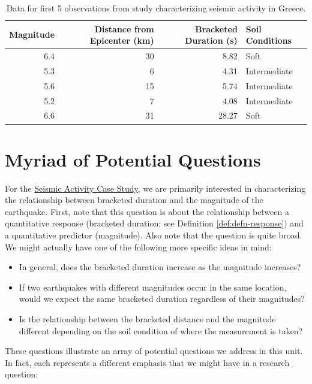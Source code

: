 \documentclass[]{book}
\providecommand{\tightlist}{%
  \setlength{\itemsep}{0pt}\setlength{\parskip}{0pt}}
\theoremstyle{definition}
\theoremstyle{definition}
\theoremstyle{definition}
\theoremstyle{remark}
\begin{document}
\begin{table}

\caption{\label{tab:casegreece-table}Data for first 5 observations from study characterizing seismic activity in Greece.}
\centering
\begin{tabular}[t]{r|r|r|l}
\hline
Magnitude & Distance from Epicenter (km) & Bracketed Duration (s) & Soil Conditions\\
\hline
6.4 & 30 & 8.82 & Soft\\
\hline
5.3 & 6 & 4.31 & Intermediate\\
\hline
5.6 & 15 & 5.74 & Intermediate\\
\hline
5.2 & 7 & 4.08 & Intermediate\\
\hline
6.6 & 31 & 28.27 & Soft\\
\hline
\end{tabular}
\end{table}

\chapter{Myriad of Potential Questions}\label{Regquestions}

For the \protect\hyperlink{CaseGreece}{Seismic Activity Case Study}, we
are primarily interested in characterizing the relationship between
bracketed duration and the magnitude of the earthquake. First, note that
this question is about the relationship between a quantitative response
(bracketed duration; see Definition \ref{def:defn-response}) and a
quantitative predictor (magnitude). Also note that the question is quite
broad. We might actually have one of the following more specific ideas
in mind:

\begin{itemize}
\tightlist
\item
  In general, does the bracketed duration increase as the magnitude
  increases?
\item
  If two earthquakes with different magnitudes occur in the same
  location, would we expect the same bracketed duration regardless of
  their magnitudes?
\item
  Is the relationship between the bracketed distance and the magnitude
  different depending on the soil condition of where the measurement is
  taken?
\end{itemize}

These questions illustrate an array of potential questions we address in
this unit. In fact, each represents a different emphasis that we might
have in a research question:
\end{document}
